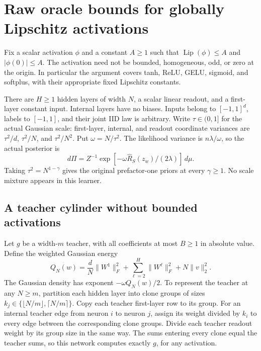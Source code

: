 \section{Raw oracle bounds for globally Lipschitz activations}
\label{sec:general-lipschitz-raw}

Fix a scalar activation $\phi$ and a constant $A\geq1$ such that
$\operatorname{Lip}(\phi)\leq A$ and $|\phi(0)|\leq A$.
The activation need not be bounded, homogeneous, odd, or zero at the
origin.  In particular the argument covers tanh, ReLU, GELU, sigmoid,
and softplus, with their appropriate fixed Lipschitz constants.

There are $H\geq1$ hidden layers of width $N$, a scalar linear readout,
and a first-layer constant input.  Internal layers have no biases.
Inputs belong to $[-1,1]^d$, labels to $[-1,1]$, and their joint IID
law is arbitrary.  Write $\tau\in(0,1]$ for the actual Gaussian scale:
first-layer, internal, and readout coordinate variances are
$\tau^2/d$, $\tau^2/N$, and $\tau^2/N^2$.
Put $\omega=N/\tau^2$.  The likelihood variance is $n\lambda/\omega$,
so the actual posterior is
\[
 d\Pi=Z^{-1}\exp[-\omega\widehat R_S(z_w)/(2\lambda)]\,d\mu.
\]
Taking $\tau^2=N^{1-\gamma}$ gives the original prefactor-one priors
at every $\gamma\geq1$.  No scale mixture appears in this learner.

\subsection{A teacher cylinder without bounded activations}

Let $g$ be a width-$m$ teacher, with all coefficients at most $B\geq1$
in absolute value.  Define the weighted Gaussian energy
\[
 Q_N(w)=\frac dN\|W^1\|_F^2+
             \sum_{\ell=2}^H\|W^\ell\|_F^2+N\|v\|_2^2.
\]
The Gaussian density has exponent $-\omega Q_N(w)/2$.
To represent the teacher at any $N\geq m$, partition each hidden
layer into clone groups of sizes
$k_j\in\{\lfloor N/m\rfloor,\lceil N/m\rceil\}$.
Copy each teacher first-layer row to its group. For an internal
teacher edge from neuron $i$ to neuron $j$, assign its weight divided
by $k_i$ to every edge between the corresponding clone groups.
Divide each teacher readout weight by its group size in the same way.
The sums entering every clone equal the teacher sums, so this network
computes exactly $g$, for any activation.

